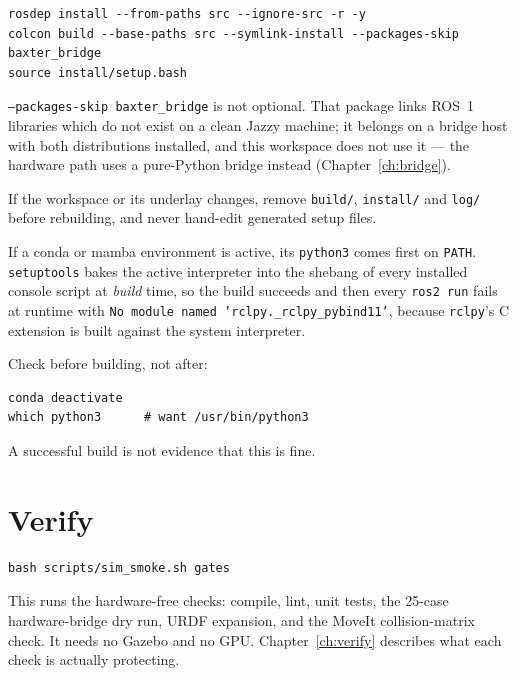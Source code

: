 \begin{lstlisting}
rosdep install --from-paths src --ignore-src -r -y
colcon build --base-paths src --symlink-install --packages-skip baxter_bridge
source install/setup.bash
\end{lstlisting}

\texttt{--packages-skip baxter\_bridge} is not optional. That package links ROS~1
libraries which do not exist on a clean Jazzy machine; it belongs on a bridge host
with both distributions installed, and this workspace does not use it --- the
hardware path uses a pure-Python bridge instead (Chapter~\ref{ch:bridge}).

If the workspace or its underlay changes, remove \texttt{build/}, \texttt{install/}
and \texttt{log/} before rebuilding, and never hand-edit generated setup files.

\begin{safetybox}
If a conda or mamba environment is active, its \texttt{python3} comes first on
\texttt{PATH}. \texttt{setuptools} bakes the active interpreter into the shebang
of every installed console script at \emph{build} time, so the build succeeds and
then every \texttt{ros2 run} fails at runtime with
\texttt{No module named 'rclpy.\_rclpy\_pybind11'}, because \texttt{rclpy}'s C
extension is built against the system interpreter.

Check before building, not after:

\begin{lstlisting}
conda deactivate
which python3      # want /usr/bin/python3
\end{lstlisting}

A successful build is not evidence that this is fine.
\end{safetybox}

\section{Verify}

\begin{lstlisting}
bash scripts/sim_smoke.sh gates
\end{lstlisting}

This runs the hardware-free checks: compile, lint, unit tests, the 25-case
hardware-bridge dry run, URDF expansion, and the MoveIt collision-matrix check.
It needs no Gazebo and no GPU. Chapter~\ref{ch:verify} describes what each check
is actually protecting.
